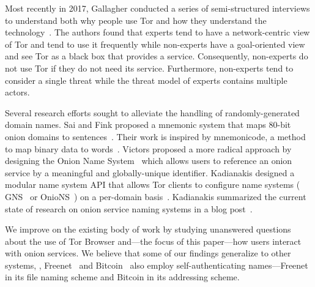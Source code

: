 Most recently in 2017, Gallagher \ea conducted a series of semi-structured
interviews to understand both why people use Tor and how they understand the
technology~\cite{Gallagher2017a}.  The authors found that experts tend to have a
network-centric view of Tor and tend to use it frequently while non-experts have
a goal-oriented view and see Tor as a black box that provides a service.
Consequently, non-experts do not use Tor if they do not need its service.
Furthermore, non-experts tend to consider a single threat while the threat model
of experts contains multiple actors.

Several research efforts sought to alleviate the handling of randomly-generated
domain names.  Sai and Fink proposed a mnemonic system that maps 80-bit onion
domains to sentences~\cite{Sai2012a}.  Their work is inspired by mnemonicode, a
method to map binary data to words~\cite{mnemonicode}.  Victors \ea proposed a
more radical approach by designing the Onion Name System~\cite{Victors2017a}
which allows users to reference an onion service by a meaningful and
globally-unique identifier.  Kadianakis \ea designed a modular name system API
that allows Tor clients to configure name systems (\eg
GNS~\cite{Schanzenbach2012a} or OnioNS~\cite{Victors2017a}) on a per-domain
basis~\cite{Kadianakis2016a}.  Kadianakis summarized the current state of
research on onion service naming systems in a blog post~\cite{Kadianakis2017a}.

We improve on the existing body of work by studying unanswered questions about
the use of Tor Browser and---the focus of this paper---how users interact with
onion services.  We believe that some of our findings generalize to other
systems, \eg, Freenet~\cite{Freenet} and Bitcoin~\cite{Nakamoto2008a} also
employ self-authenticating names---Freenet in its file naming scheme and Bitcoin
in its addressing scheme.
